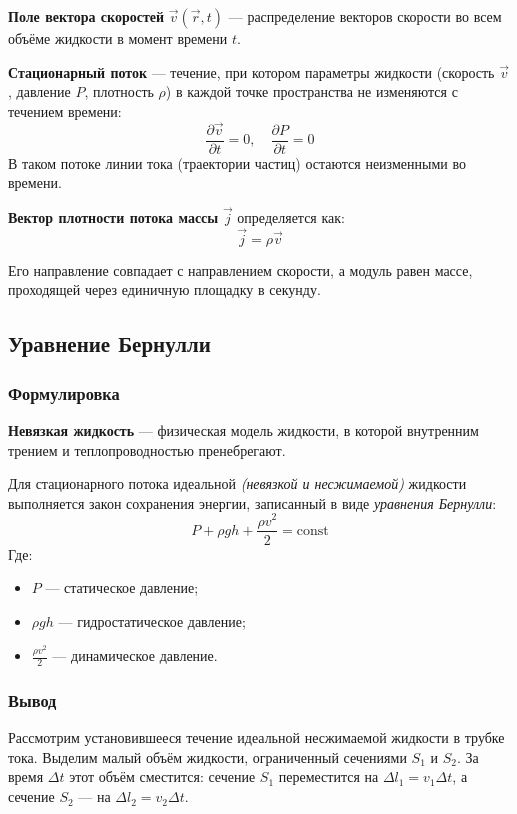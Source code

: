 \textbf{Поле вектора скоростей} $\vec{v}(\vec{r}, t)$ --- распределение векторов скорости во всем объёме жидкости в момент времени \( t \).

\textbf{Стационарный поток} --- течение, при котором параметры жидкости (скорость $\vec{v}$, давление $P$, плотность $\rho$) в каждой точке пространства не изменяются с течением времени:
\[
\frac{\partial \vec{v}}{\partial t} = 0, \quad \frac{\partial P}{\partial t} = 0
\]
В таком потоке линии тока (траектории частиц) остаются неизменными во времени.

\textbf{Вектор плотности потока массы} $\vec{j}$ определяется как:
\[
\vec{j} = \rho \vec{v}
\]

Его направление совпадает с направлением скорости, а модуль равен массе, проходящей через единичную площадку в секунду. 

\subsection{Уравнение Бернулли}

\subsubsection{Формулировка}

\textbf{Невязкая жидкость} --- физическая модель жидкости, в которой внутренним трением и теплопроводностью пренебрегают.

Для стационарного потока идеальной \textit{(невязкой и несжимаемой)} жидкости выполняется закон сохранения энергии, записанный в виде \textit{уравнения Бернулли}: 
\[
P + \rho g h + \frac{\rho v^2}{2} = \text{const}
\]
Где:
\begin{itemize}
    \item $P$ --- статическое давление; 
    \item $\rho g h$ --- гидростатическое давление; 
    \item $\frac{\rho v^2}{2}$ --- динамическое давление. 
\end{itemize}

\subsubsection{Вывод}

Рассмотрим установившееся течение идеальной несжимаемой жидкости в трубке тока. Выделим малый объём жидкости, ограниченный сечениями $S_1$ и $S_2$. За время $\Delta t$ этот объём сместится: сечение $S_1$ переместится на $\Delta l_1 = v_1 \Delta t$, а сечение $S_2$ — на $\Delta l_2 = v_2 \Delta t$.


